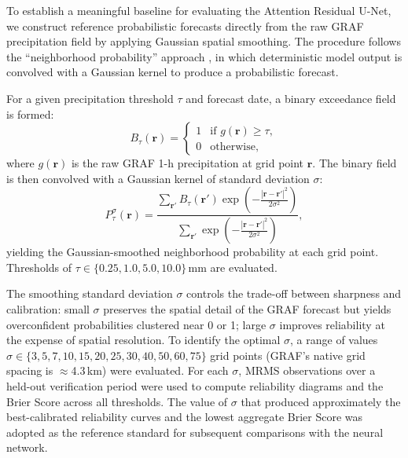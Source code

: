 \documentclass[11pt]{article}
\newcommand{\vect}[1]{\bm{#1}}
\begin{document}
To establish a meaningful baseline for evaluating the Attention
Residual U-Net, we construct reference probabilistic forecasts
directly from the raw GRAF precipitation field by applying
Gaussian spatial smoothing.  The procedure follows the
``neighborhood probability'' approach \citep[e.g.,][]{theis2005, schwartz2015},
in which deterministic model output is convolved with a Gaussian
kernel to produce a probabilistic forecast.

For a given precipitation threshold $\tau$ and forecast date, a
binary exceedance field is formed:
\begin{equation}
  B_\tau(\vect{r}) =
  \begin{cases} 1 & \text{if } g(\vect{r}) \geq \tau, \\
                0 & \text{otherwise,} \end{cases}
\end{equation}
where $g(\vect{r})$ is the raw GRAF 1-h precipitation at grid point
$\vect{r}$.  The binary field is then convolved with a Gaussian
kernel of standard deviation $\sigma$:
\begin{equation}
  P_\tau^\sigma(\vect{r}) =
    \frac{\displaystyle\sum_{\vect{r}'} B_\tau(\vect{r}')
      \exp\!\!\left(-\tfrac{|\vect{r}-\vect{r}'|^2}{2\sigma^2}\right)}
         {\displaystyle\sum_{\vect{r}'}
      \exp\!\!\left(-\tfrac{|\vect{r}-\vect{r}'|^2}{2\sigma^2}\right)},
  \label{eq:gauss_prob}
\end{equation}
yielding the Gaussian-smoothed neighborhood probability at each
grid point.  Thresholds of $\tau \in \{0.25, 1.0, 5.0, 10.0\}$\,mm
are evaluated.

The smoothing standard deviation $\sigma$ controls the trade-off
between sharpness and calibration: small $\sigma$ preserves the
spatial detail of the GRAF forecast but yields overconfident
probabilities clustered near 0 or 1; large $\sigma$ improves
reliability at the expense of spatial resolution.  To identify the
optimal $\sigma$, a range of values
$\sigma \in \{3, 5, 7, 10, 15, 20, 25, 30, 40, 50, 60, 75\}$ grid points
(GRAF's native grid spacing is $\approx$4.3\,km)
were evaluated.  For each $\sigma$, MRMS
observations over a held-out verification period were used to
compute reliability diagrams and the Brier Score across all
thresholds.  The value of $\sigma$ that produced approximately the
best-calibrated reliability curves and the lowest aggregate Brier
Score was adopted as the reference standard for subsequent
comparisons with the neural network.
\end{document}
